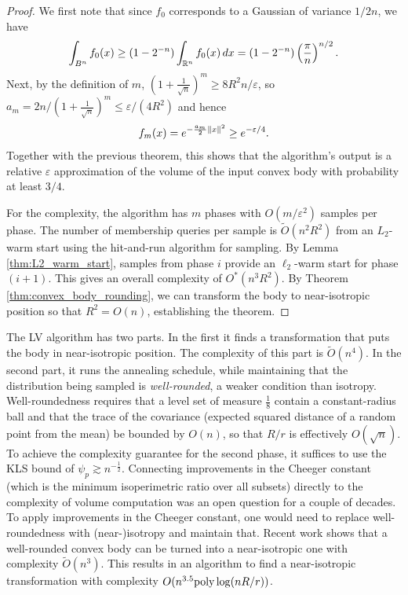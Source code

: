 \begin{proof}
We first note that since $f_{0}$ corresponds to a Gaussian of variance
$1/2n$, we have 
\[
\int_{B^{n}}f_{0}(x)\ge(1-2^{-n})\int_{\mathbb{R}^{n}}f_{0}(x)\,dx=(1-2^{-n})\left(\frac{\pi}{n}\right)^{n/2}.
\]
Next, by the definition of $m$, $(1+\frac{1}{\sqrt{n}})^{m}\ge8R^{2}n/\varepsilon$,
so $a_{m}=2n/(1+\frac{1}{\sqrt{n}})^{m}\le\varepsilon/(4R^{2})$ and
hence 
\[
f_{m}(x)=e^{-\frac{a_{m}}{2}\left\Vert x\right\Vert^{2}}\ge e^{-\varepsilon/4}.
\]
Together with the previous theorem, this shows that the algorithm's
output is a relative $\varepsilon$ approximation of the volume of
the input convex body with probability at least $3/4$. 

For the complexity, the algorithm has $m$ phases with $O(m/\varepsilon^{2})$
samples per phase. The number of membership queries per sample is
$\widetilde{O}(n^{2}R^{2})$ from an $L_{2}$-warm start using the
hit-and-run algorithm for sampling. By Lemma \ref{thm:L2_warm_start},
samples from phase $i$ provide an $\ell_{2}$-warm start for phase
$(i+1)$. This gives an overall complexity of $O^{*}(n^{3}R^{2})$.
By Theorem \ref{thm:convex_body_rounding}, we can transform the body
to near-isotropic position so that $R^{2}=O(n)$, establishing the
theorem. 
\end{proof}
The LV algorithm has two parts. In the first it finds a transformation
that puts the body in near-isotropic position. The complexity of this
part is $\widetilde{O}(n^{4})$. In the second part, it runs the annealing
schedule, while maintaining that the distribution being sampled is
\emph{well-rounded}, a weaker condition than isotropy. Well-roundedness
requires that a level set of measure $\frac{1}{8}$ contain a constant-radius
ball and that the trace of the covariance (expected squared distance
of a random point from the mean) be bounded by $O(n)$, so that $R/r$
is effectively $O(\sqrt{n})$. To achieve the complexity guarantee
for the second phase, it suffices to use the KLS bound of $\psi_{p}\gtrsim n^{-\frac{1}{2}}$.
Connecting improvements in the Cheeger constant (which is the minimum
isoperimetric ratio over all subsets) directly to the complexity of
volume computation was an open question for a couple of decades. To
apply improvements in the Cheeger constant, one would need to replace
well-roundedness with (near-)isotropy and maintain that. Recent work
shows that a well-rounded convex body can be turned into a near-isotropic
one with complexity $\tilde{O}(n^{3})$. This results in an algorithm
to find a near-isotropic transformation with complexity $O(n^{3.5}\mbox{poly}\log(nR/r))$. 

